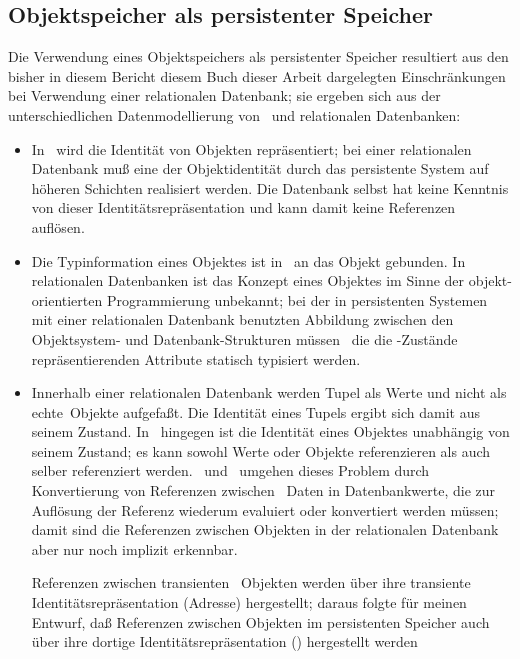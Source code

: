 \subsection{Objektspeicher als persistenter Speicher}%
\label{sec:plobjs}%
%
Die Verwendung eines Objektspeichers als persistenter Speicher
resultiert aus den bisher in \ifbericht diesem Bericht \else\ifbuch
diesem Buch \else dieser Arbeit \fi\fi dargelegten Einschr\"{a}nkungen
bei Verwendung einer relationalen Datenbank; sie ergeben sich aus der
unterschiedlichen Datenmodellierung von \cl\ und relationalen
Datenbanken:
\begin{itemize}
%
\item In \cl\ wird die Identit\"{a}t von Objekten repr\"{a}sentiert;
bei einer relationalen Datenbank mu\ss{} eine \representation{} der
Objektidentit\"{a}t durch das persistente System auf h\"{o}\-he\-ren
Schichten realisiert werden. Die Datenbank selbst hat keine Kenntnis
von dieser Identit\"{a}tsrepr\"{a}sentation und kann damit keine Referenzen
aufl\"{o}sen.
%
\item Die Typinformation eines Objektes ist in \cl\ an das Objekt
gebunden. In relationalen Datenbanken ist das Konzept eines Objektes
im Sinne der objekt-orientierten Programmierung unbekannt; bei der
in persistenten Systemen mit einer relationalen Datenbank benutzten
Abbildung zwischen den Objektsystem- und Datenbank-Strukturen
m\"{u}s\-sen \ia\ die die \Slt\/-Zust\"{a}nde repr\"{a}sentierenden
Attribute statisch typisiert werden.
%
\item Innerhalb einer relationalen Datenbank werden Tupel als Werte
und nicht als \rglq{}echte\rgrq\ Objekte aufgefa\ss{}t. Die Identit\"{a}t
eines Tupels ergibt sich damit aus seinem Zustand. In \cl\ hingegen
ist die Identit\"{a}t eines Objektes un\-ab\-h\"{a}n\-gig von seinem
Zustand; es kann sowohl Werte oder Objekte referenzieren als auch
selber referenziert werden. \soh\ und \pclos\ umgehen dieses Problem
durch Konvertierung von Referenzen zwischen \cl\ Daten in
Datenbankwerte, die zur Aufl\"{o}sung der Referenz wiederum evaluiert
oder konvertiert werden m\"{u}ssen; damit sind die Referenzen zwischen
Objekten in der relationalen Datenbank aber nur noch implizit
erkennbar.
%
\par{}Referenzen zwischen transienten \cl\ Objekten werden \"{u}ber ihre
transiente Iden\-ti\-t\"{a}ts\-re\-pr\"{a}\-sen\-ta\-tion (Adresse)
hergestellt; daraus folgte f\"{u}r meinen Entwurf, da\ss{} Referenzen
zwischen Objekten im persistenten Speicher auch \"{u}ber ihre dortige
Iden\-ti\-t\"{a}ts\-re\-pr\"{a}\-sen\-ta\-tion (\objid\/) hergestellt werden

\end{itemize}
